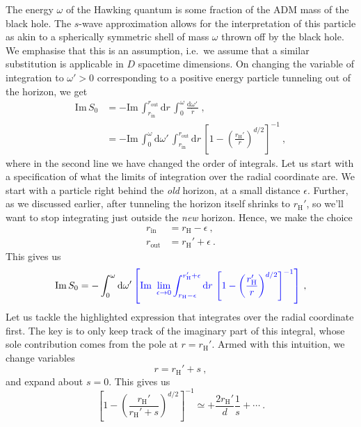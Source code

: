 \documentclass[a4paper,11pt]{article}
\newcommand{\dd}[1]{\text{d}#1 \, }
\newcommand{\im}{\text{Im} \,}
\begin{document}
The energy $\omega$ of the Hawking quantum is some fraction of the ADM mass of the black hole. The $s$-wave approximation allows for the interpretation of this particle as akin to a spherically symmetric shell of mass $\omega$ thrown off by the black hole. We emphasise that this is an assumption, i.e.~we assume that a similar substitution is applicable in $D$ spacetime dimensions. On changing the variable of integration to $\omega' > 0$ corresponding to a positive energy particle tunneling out of the horizon, we get
\begin{align}
\im S_0 &= - \im \int_{r_{\text{in}}}^{r_{\text{out}}} \dd{r} \int_{0}^{\omega} \frac{\dd{\omega'}}{\dot{r}} \ , \\
&= - \im \int_{0}^{\omega} \dd{\omega'} \int_{r_{\text{in}}}^{r_{\text{out}}} \dd{r} \left[ 1- \left( \frac{r_{\text{H}}'}{r} \right)^{d/2} \right]^{-1} \ ,
\end{align}
where in the second line we have changed the order of integrals. Let us start with a specification of what the limits of integration over the radial coordinate are. We start with a particle right behind the \emph{old} horizon, at a small distance $\epsilon$. Further, as we discussed earlier, after tunneling the horizon itself shrinks to $r_{\text{H}}'$, so we'll want to stop integrating just outside the \emph{new} horizon. Hence, we make the choice
\begin{align}
r_{\text{in}} &= r_{\text{H}} - \epsilon \ , \\
r_{\text{out}} &= r_{\text{H}}' + \epsilon \ .
\end{align}
This gives us
\begin{equation}
\im S_0 = -\int_{0}^{\omega} \dd{\omega'} \textcolor{blue}{\left[\im \, \lim_{\epsilon \rightarrow 0} \int_{r_{\text{H}} - \epsilon}^{r_{\text{H}}' + \epsilon} \dd{r} \left[ 1- \left( \frac{r_{\text{H}}'}{r} \right)^{d/2} \right]^{-1} \right]} \ ,
\end{equation}
Let us tackle the highlighted expression that integrates over the radial coordinate first. The key is to only keep track of the imaginary part of this integral, whose sole contribution comes from the pole at $r = r_{\text{H}}'$. Armed with this intuition, we change variables
\begin{equation}
r = r_{\text{H}}' + s \ ,
\end{equation}
and expand about $s = 0$. This gives us
\begin{equation}
\left[ 1-\left( \frac{r_{\text{H}}'}{r_{\text{H}}'+ s} \right)^{d/2} \right]^{-1} \simeq + \frac{2 r_{\text{H}}'}{d} \frac{1}{s} + \cdots \ .
\end{equation}
\end{document}

